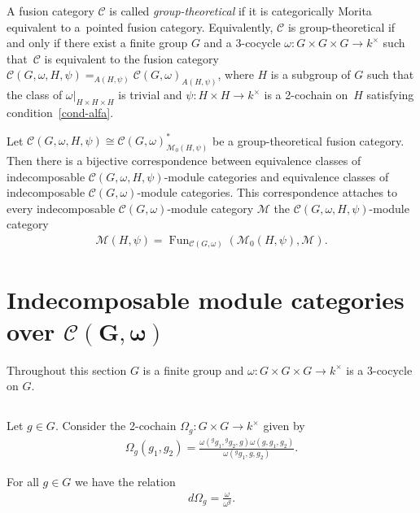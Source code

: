 \documentclass[11pt]{article}
\numberwithin{equation}{section}
\newcommand{\cch}{\Omega}
\newcommand{\C}{{\mathcal C}}
\newcommand{\M}{{\mathcal M}}
\newcommand{\1}{\textbf{1}}
\newcommand\Fun{\operatorname{Fun}}
\begin{document}
A fusion category $\C$ is called \emph{group-theoretical} if it is categorically Morita equivalent to a~pointed fusion category. Equivalently, $\C$ is group-theoretical if and only if there exist a f\/inite group $G$ and a $3$-cocycle $\omega\colon G \times G \times G \to k^{\times}$ such that~$\C$ is equivalent to the fusion category $\C(G, \omega, H, \psi) = _{A(H, \psi)\!}\C(G, \omega)_{A(H, \psi)}$, where $H$ is a subgroup of $G$ such that the class of $\omega\vert_{H\times H \times H}$ is trivial and $\psi\colon H \times H \to k^{\times}$ is a 2-cochain on~$H$ satisfying condition~\eqref{cond-alfa}.

Let $\C(G, \omega, H, \psi) \cong \C(G, \omega)^*_{\M_0(H, \psi)}$ be a group-theoretical fusion category. Then there is a bijective correspondence between equivalence classes of indecomposable $\C(G, \omega, H, \psi)$-module categories and equivalence classes of indecomposable $\C(G, \omega)$-module categories. This correspondence attaches to every indecomposable $\C(G, \omega)$-module category $\M$ the $\C(G, \omega, H, \psi)$-module category
\begin{gather*}\M(H, \psi) = \Fun_{\C(G, \omega)}(\M_0(H, \psi), \M). \end{gather*}

\section[Indecomposable module categories over $\C(G, \omega)$]{Indecomposable module categories over $\boldsymbol{\C(G, \omega)}$}\label{ptd-mc}

Throughout this section $G$ is a f\/inite group and $\omega \colon G \times G \times G \to k^\times$ is a 3-cocycle on $G$.

\subsection{}\label{adj-action} Let $g \in G$. Consider the 2-cochain $\cch_g\colon G \times G \to k^{\times}$ given by
\begin{gather*}\cch_g(g_1, g_2) = \frac{\omega({}^gg_1, {}^gg_2, g) \omega(g, g_1, g_2)}{\omega({}^gg_1, g, g_2)}.
\end{gather*}

For all $g \in G$ we have the relation
\begin{gather}\label{o-oy}d\cch_g = \frac{\omega}{\omega^g}.
\end{gather}
\end{document}
